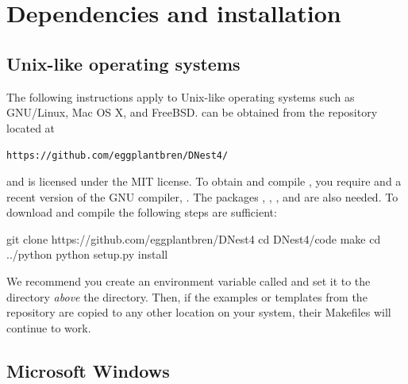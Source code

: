 \documentclass[article]{jss}
\begin{document}






\section{Dependencies and installation}\label{sec:installation}

\subsection{Unix-like operating systems}
The following instructions apply to Unix-like operating systems such as
GNU/Linux, Mac OS X, and FreeBSD.
 can be obtained from the  repository located at
\begin{center}
{\tt https://github.com/eggplantbren/DNest4/}\\
\end{center}
and is licensed under the
MIT license. To obtain and compile ,
you require  and a recent version of the GNU
 compiler, . The 
packages , ,
, and  are also needed.
To download and compile 
the following steps are sufficient:
\begin{CodeChunk}
\begin{CodeInput}
git clone https://github.com/eggplantbren/DNest4
cd DNest4/code
make
cd ../python
python setup.py install
\end{CodeInput}
\end{CodeChunk}

We recommend you create an environment variable called 
and set it to the directory {\em above} the  directory. Then,
if the examples or templates from the  repository are copied
to any other location on your system, their Makefiles will continue to work.

\subsection{Microsoft Windows}
\end{document}

